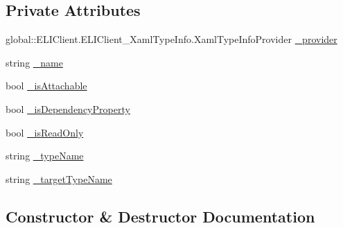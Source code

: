 \subsection*{Private Attributes}
\begin{DoxyCompactItemize}
\item 
global\+::\+E\+L\+I\+Client.\+E\+L\+I\+Client\+\_\+\+Xaml\+Type\+Info.\+Xaml\+Type\+Info\+Provider \hyperlink{class_e_l_i_client_1_1_e_l_i_client___xaml_type_info_1_1_xaml_member_a154676c02a9a9a9e61c7c6085db8b228}{\+\_\+provider}
\item 
string \hyperlink{class_e_l_i_client_1_1_e_l_i_client___xaml_type_info_1_1_xaml_member_aec473ba5c1c8dc9e1e46c13c1d65ea19}{\+\_\+name}
\item 
bool \hyperlink{class_e_l_i_client_1_1_e_l_i_client___xaml_type_info_1_1_xaml_member_abc26e9dcfd0bd5bcee90853340ce44bc}{\+\_\+is\+Attachable}
\item 
bool \hyperlink{class_e_l_i_client_1_1_e_l_i_client___xaml_type_info_1_1_xaml_member_a6fceb884ffcef199dcb14ea0e6b009c5}{\+\_\+is\+Dependency\+Property}
\item 
bool \hyperlink{class_e_l_i_client_1_1_e_l_i_client___xaml_type_info_1_1_xaml_member_a49dc72217f8b54761ac191ad2a2a8af5}{\+\_\+is\+Read\+Only}
\item 
string \hyperlink{class_e_l_i_client_1_1_e_l_i_client___xaml_type_info_1_1_xaml_member_a61683fc244095a884c7ad9d8035baeb8}{\+\_\+type\+Name}
\item 
string \hyperlink{class_e_l_i_client_1_1_e_l_i_client___xaml_type_info_1_1_xaml_member_aa0ac5b4726a82f7e0ddf06a3a75d23f9}{\+\_\+target\+Type\+Name}
\end{DoxyCompactItemize}


\subsection{Constructor \& Destructor Documentation}
\mbox{\label{class_e_l_i_client_1_1_e_l_i_client___xaml_type_info_1_1_xaml_member_a459e15df1bb2f1db7eb674875071d4ed}} 
